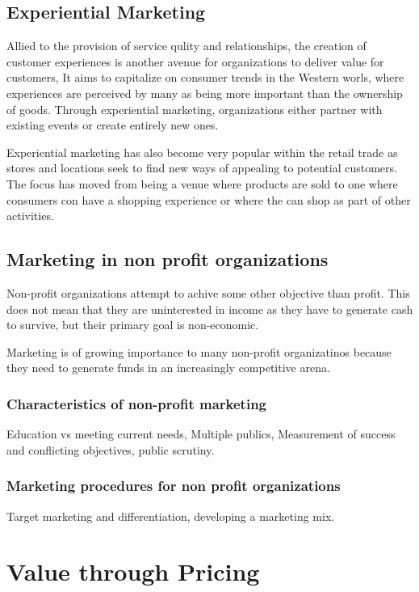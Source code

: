 \documentclass{article}
\begin{document}
\subsection{Experiential Marketing}
Allied to the provision of service qulity and relationships, the creation of customer experiences is another avenue for organizations to deliver value for customers, It aims to capitalize on consumer trends in the Western worls, where experiences are perceived by many as being more important than the ownership of goods. Through experiential marketing, organizations either partner with existing events or create entirely new ones. 

Experiential marketing has also become very popular within the retail trade as stores and locations seek to find new ways of appealing to potential customers. The focus has moved from being a venue where products are sold to one where consumers con have a shopping experience or where the can shop as part of other activities.

\subsection{Marketing in non profit organizations}
Non-profit organizations attempt to achive some other objective than profit. This does not mean that they are uninterested in income as they have to generate cash to survive, but their primary goal is non-economic.

Marketing is of growing importance to many non-profit organizatinos because they need to generate funds in an increasingly competitive arena.

\subsubsection*{Characteristics of non-profit marketing}
Education vs meeting current needs, Multiple publics, Measurement of success and conflicting objectives, public scrutiny.

\subsubsection*{Marketing procedures for non profit organizations}
Target marketing and differentiation, developing a marketing mix.

\section{Value through Pricing}
\end{document}
